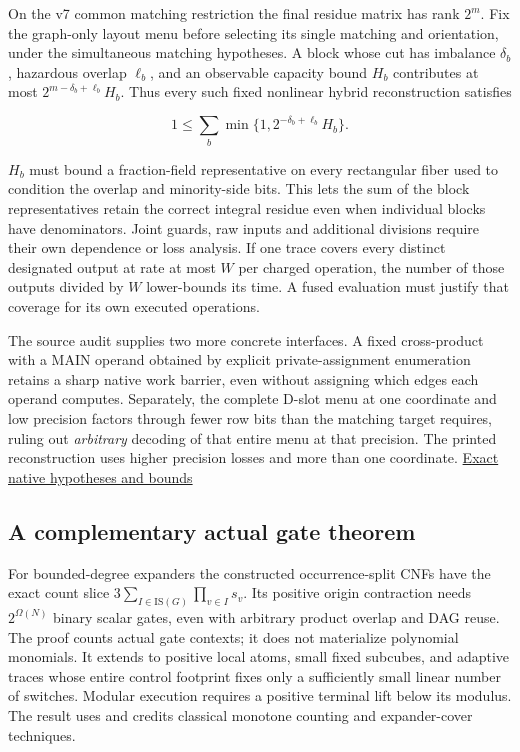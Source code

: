 \documentclass[11pt,a4paper]{article}
\begin{document}
On the v7 common matching restriction the final residue matrix has rank
\(2^m\). Fix the graph-only layout menu before selecting its single
matching and orientation, under the simultaneous matching hypotheses. A
block whose cut has imbalance \(\delta_b\), hazardous overlap
\(\ell_b\), and an observable capacity bound \(H_b\) contributes at most
\(2^{m-\delta_b+\ell_b}H_b\). Thus every such fixed nonlinear hybrid
reconstruction satisfies

\[
 1\le\sum_b\min\{1,2^{-\delta_b+\ell_b}H_b\}. \tag{U7}
\]

\(H_b\) must bound a fraction-field representative on every rectangular
fiber used to condition the overlap and minority-side bits. This lets
the sum of the block representatives retain the correct integral residue
even when individual blocks have denominators. Joint guards, raw inputs
and additional divisions require their own dependence or loss analysis.
If one trace covers every distinct designated output at rate at most
\(W\) per charged operation, the number of those outputs divided by
\(W\) lower-bounds its time. A fused evaluation must justify that
coverage for its own executed operations.

The source audit supplies two more concrete interfaces. A fixed
cross-product with a MAIN operand obtained by explicit
private-assignment enumeration retains a sharp native work barrier, even
without assigning which edges each operand computes. Separately, the
complete D-slot menu at one coordinate and low precision factors through
fewer row bits than the matching target requires, ruling out
\emph{arbitrary} decoding of that entire menu at that precision. The
printed reconstruction uses higher precision losses and more than one
coordinate. \hyperref[v8-section-native-escape]{Exact native hypotheses and
bounds}

\subsection{A complementary actual gate
theorem}\label{v8-a-complementary-actual-gate-theorem}

For bounded-degree expanders the constructed occurrence-split CNFs have
the exact count slice \(3\sum_{I\in\mathrm{IS}(G)}\prod_{v\in I}s_v\).
Its positive origin contraction needs \(2^{\Omega(N)}\) binary scalar
gates, even with arbitrary product overlap and DAG reuse. The proof
counts actual gate contexts; it does not materialize polynomial
monomials. It extends to positive local atoms, small fixed subcubes, and
adaptive traces whose entire control footprint fixes only a sufficiently
small linear number of switches. Modular execution requires a positive
terminal lift below its modulus. The result uses and credits classical
monotone counting and expander-cover techniques.
\end{document}
